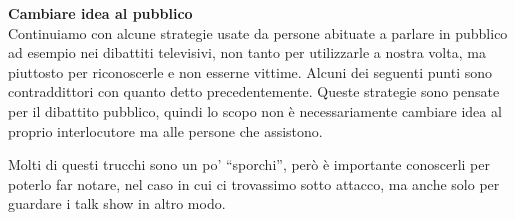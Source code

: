 \documentclass[12pt]{book} %
\begin{document}
\noindent \textbf{\large Cambiare idea al pubblico} \\
Continuiamo con alcune strategie usate da persone abituate a parlare in pubblico ad esempio nei dibattiti televisivi,
non tanto per utilizzarle a nostra volta, ma piuttosto per riconoscerle e non esserne vittime. Alcuni dei seguenti
punti sono contraddittori con quanto detto precedentemente. Queste strategie sono pensate per il dibattito pubblico,
quindi lo scopo non è necessariamente cambiare idea al proprio interlocutore ma alle persone che assistono. 

Molti di questi trucchi sono un po' “sporchi”, però è importante conoscerli per poterlo far notare, nel
caso in cui ci trovassimo sotto attacco, ma anche solo per guardare i talk show in altro modo.
\end{document}
